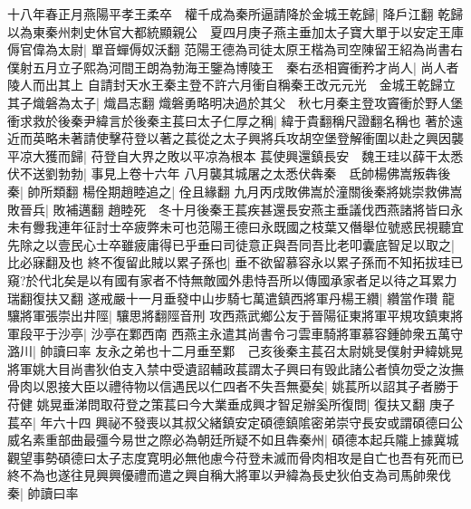 十八年春正月燕陽平孝王柔卒　權千成為秦所逼請降於金城王乾歸|{
	降戶江翻}
乾歸以為東秦州刺史休官大都統顯親公　夏四月庚子燕主垂加太子寶大單于以安定王庫傉官偉為太尉|{
	單音蟬傉奴沃翻}
范陽王德為司徒太原王楷為司空陳留王紹為尚書右僕射五月立子熙為河間王朗為勃海王鑒為博陵王　秦右丞相竇衝矜才尚人|{
	尚人者陵人而出其上}
自請封天水王秦主登不許六月衝自稱秦王改元元光　金城王乾歸立其子熾磐為太子|{
	熾昌志翻}
熾磐勇略明决過於其父　秋七月秦主登攻竇衝於野人堡衝求救於後秦尹緯言於後秦主萇曰太子仁厚之稱|{
	緯于貴翻稱尺證翻名稱也}
著於遠近而英略未著請使擊苻登以著之萇從之太子興將兵攻胡空堡登解衝圍以赴之興因襲平凉大獲而歸|{
	苻登自大界之敗以平凉為根本}
萇使興還鎮長安　魏王珪以薛干太悉伏不送劉勃勃|{
	事見上卷十六年}
八月襲其城屠之太悉伏犇秦　氐帥楊佛嵩叛犇後秦|{
	帥所類翻}
楊佺期趙睦追之|{
	佺且緣翻}
九月丙戌敗佛嵩於潼關後秦將姚崇救佛嵩敗晉兵|{
	敗補邁翻}
趙睦死　冬十月後秦王萇疾甚還長安燕主垂議伐西燕諸將皆曰永未有釁我連年征討士卒疲弊未可也范陽王德曰永既國之枝葉又僭舉位號惑民視聽宜先除之以壹民心士卒雖疲庸得已乎垂曰司徒意正與吾同吾比老叩囊底智足以取之|{
	比必寐翻及也}
終不復留此賊以累子孫也|{
	垂不欲留慕容永以累子孫而不知拓拔珪已窺?於代北矣是以有國有家者不恃無敵國外患恃吾所以傳國承家者足以待之耳累力瑞翻復扶又翻}
遂戒嚴十一月垂發中山步騎七萬遣鎮西將軍丹楊王纘|{
	纘當作瓚}
龍驤將軍張崇出井陘|{
	驤思將翻陘音刑}
攻西燕武鄉公友于晉陽征東將軍平規攻鎮東將軍段平于沙亭|{
	沙亭在鄴西南}
西燕主永遣其尚書令刁雲車騎將軍慕容鍾帥衆五萬守潞川|{
	帥讀曰率}
友永之弟也十二月垂至鄴　己亥後秦主萇召太尉姚旻僕射尹緯姚晃將軍姚大目尚書狄伯支入禁中受遺詔輔政萇謂太子興曰有毁此諸公者慎勿受之汝撫骨肉以恩接大臣以禮待物以信遇民以仁四者不失吾無憂矣|{
	姚萇所以詔其子者勝于苻健}
姚晃垂涕問取苻登之策萇曰今大業垂成興才智足辦奚所復問|{
	復扶又翻}
庚子萇卒|{
	年六十四}
興祕不發喪以其叔父緒鎮安定碩德鎮隂密弟崇守長安或謂碩德曰公威名素重部曲最彊今易世之際必為朝廷所疑不如且犇秦州|{
	碩德本起兵隴上據冀城}
觀望事勢碩德曰太子志度寛明必無他慮今苻登未滅而骨肉相攻是自亡也吾有死而已終不為也遂往見興興優禮而遣之興自稱大將軍以尹緯為長史狄伯支為司馬帥衆伐秦|{
	帥讀曰率}


